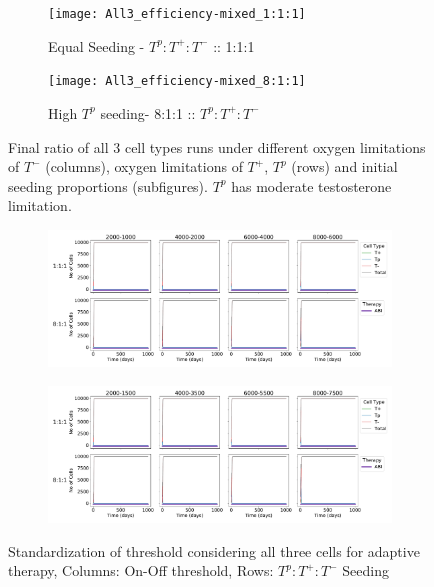 \begin{figure}[h!]
  \centering
  \begin{subfigure}[b]{\textwidth}
    \centering
    \texttt{[image: All3\_efficiency-mixed\_1:1:1]}
    \caption{Equal Seeding - $T^p:T^+:T^-$ :: 1:1:1 }
    \label{fig_all3-mixed_1:1:1}
  \end{subfigure}
  \begin{subfigure}[b]{\textwidth}
    \centering
    \texttt{[image: All3\_efficiency-mixed\_8:1:1]}
    \caption{High $T^p$ seeding- 8:1:1 :: $T^p:T^+:T^-$}
    \label{fig_all3-mixed_8:1:1}
  \end{subfigure}
  \caption[Final ratio of all 3 cell types runs under different limitations for each cell type]{Final ratio of all 3 cell types runs under different oxygen limitations of $T^-$ (columns), oxygen limitations of $T^+$, $T^p$ (rows) and initial seeding proportions (subfigures). $T^p$ has moderate testosterone limitation.}
  \label{fig_all3-mixed}
\end{figure}

\begin{figure}[h!]
  \centering
  \begin{subfigure}[b]{\textwidth}
    \centering
    \includegraphics[width=\textwidth]{figures/All3_therapy-standardization-total}
  \end{subfigure}
  \begin{subfigure}[b]{\textwidth}
    \centering
    \includegraphics[width=\textwidth]{figures/All3_therapy-standardization-total-sw}
  \end{subfigure}
  \caption[Standardization of threshold considering all 3 cells for adaptive therapy]{Standardization of threshold considering all three cells for adaptive therapy, Columns: On-Off threshold, Rows: $T^p:T^+:T^-$ Seeding}
  \label{fig_therapy-AT_standardization-Total}
\end{figure}
